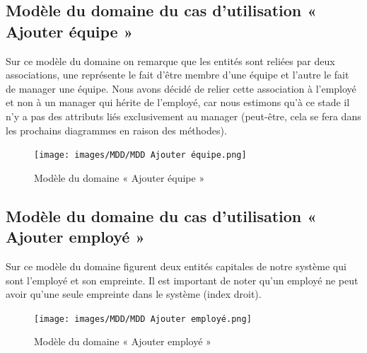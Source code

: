         \subsection*{Modèle du domaine du cas d'utilisation « Ajouter équipe »}
        Sur ce modèle du domaine on remarque que les entités sont reliées par deux associations, une représente le fait d’être membre d’une équipe et l’autre le fait de manager une équipe. Nous avons décidé de relier cette association à l’employé et non à un manager qui hérite de l’employé, car nous estimons qu’à ce stade il n’y a pas des attributs liés exclusivement au manager (peut-être, cela se fera dans les prochains diagrammes en raison des méthodes).   
            \begin{figure}[h!]
                 \centering
                \texttt{[image: images/MDD/MDD Ajouter équipe.png]}
                 \caption{Modèle du domaine « Ajouter équipe »}
                 \label{fig15}
            \end{figure}
            
        \subsection*{Modèle du domaine du cas d'utilisation « Ajouter employé »}
        Sur ce modèle du domaine figurent deux entités capitales de notre système qui sont l’employé et son empreinte. Il est important de noter qu’un employé ne peut avoir qu’une seule empreinte dans le système (index droit).
        \clearpage
            \begin{figure}[h!]
                 \centering
                \texttt{[image: images/MDD/MDD Ajouter employé.png]}
                 \caption{Modèle du domaine « Ajouter employé »}
                 \label{fig16}
            \end{figure}
            
